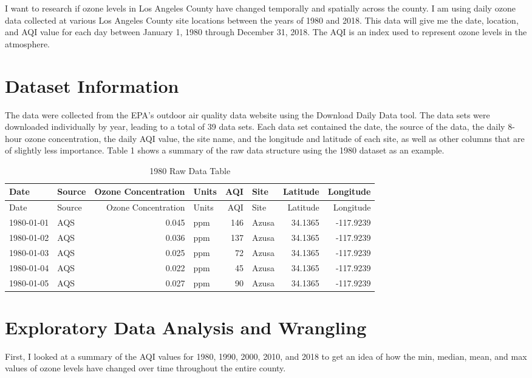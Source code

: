 \documentclass[12pt,]{article}
\begin{document}
I want to research if ozone levels in Los Angeles County have changed
temporally and spatially across the county. I am using daily ozone data
collected at various Los Angeles County site locations between the years
of 1980 and 2018. This data will give me the date, location, and AQI
value for each day between January 1, 1980 through December 31, 2018.
The AQI is an index used to represent ozone levels in the atmosphere.

\newpage

\section{Dataset Information}\label{dataset-information}

The data were collected from the EPA's outdoor air quality data website
using the Download Daily Data tool. The data sets were downloaded
individually by year, leading to a total of 39 data sets. Each data set
contained the date, the source of the data, the daily 8-hour ozone
concentration, the daily AQI value, the site name, and the longitude and
latitude of each site, as well as other columns that are of slightly
less importance. Table 1 shows a summary of the raw data structure using
the 1980 dataset as an example.

\begin{longtable}[]{@{}llrlrlrr@{}}
\caption{1980 Raw Data Table}\tabularnewline
\toprule
Date & Source & Ozone Concentration & Units & AQI & Site & Latitude &
Longitude\tabularnewline
\midrule
\endfirsthead
\toprule
Date & Source & Ozone Concentration & Units & AQI & Site & Latitude &
Longitude\tabularnewline
\midrule
\endhead
1980-01-01 & AQS & 0.045 & ppm & 146 & Azusa & 34.1365 &
-117.9239\tabularnewline
1980-01-02 & AQS & 0.036 & ppm & 137 & Azusa & 34.1365 &
-117.9239\tabularnewline
1980-01-03 & AQS & 0.025 & ppm & 72 & Azusa & 34.1365 &
-117.9239\tabularnewline
1980-01-04 & AQS & 0.022 & ppm & 45 & Azusa & 34.1365 &
-117.9239\tabularnewline
1980-01-05 & AQS & 0.027 & ppm & 90 & Azusa & 34.1365 &
-117.9239\tabularnewline
\bottomrule
\end{longtable}

\newpage

\section{Exploratory Data Analysis and
Wrangling}\label{exploratory-data-analysis-and-wrangling}

First, I looked at a summary of the AQI values for 1980, 1990, 2000,
2010, and 2018 to get an idea of how the min, median, mean, and max
values of ozone levels have changed over time throughout the entire
county.
\end{document}
